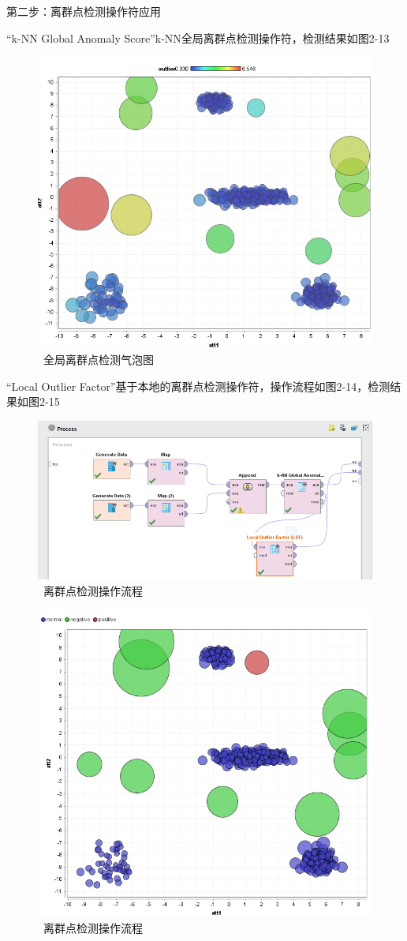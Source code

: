 第二步：离群点检测操作符应用

“k-NN Global Anomaly Score”k-NN全局离群点检测操作符，检测结果如图2-13

\begin{figure}[thbp!]
\centering
\includegraphics[width=0.4\linewidth]{figure/2-16}
\caption{\ 全局离群点检测气泡图}
\label{fig:2-16}
\end{figure}

“Local Outlier Factor”基于本地的离群点检测操作符，操作流程如图2-14，检测结果如图2-15

\begin{figure}[thbp!]
\centering
\includegraphics[width=0.4\linewidth]{figure/2-17}
\caption{\ 离群点检测操作流程}
\label{fig:2-17}
\end{figure}

\begin{figure}[thbp!]
\centering
\includegraphics[width=0.4\linewidth]{figure/2-18}
\caption{\ 离群点检测操作流程}
\label{fig:2-18}
\end{figure}

